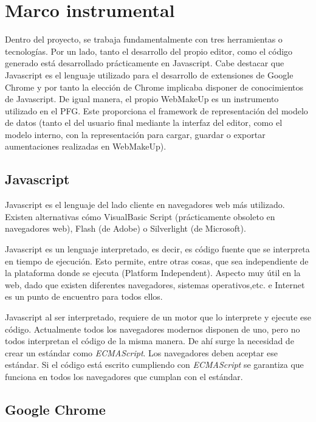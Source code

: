 \section{Marco instrumental}

Dentro del proyecto, se trabaja fundamentalmente con tres herramientas o tecnologías. Por un lado, tanto el desarrollo del propio editor, como el código generado está desarrollado prácticamente en Javascript. Cabe destacar que Javascript es el lenguaje utilizado para el desarrollo de extensiones de Google Chrome y por tanto la elección de Chrome implicaba disponer de conocimientos de Javascript. De igual manera, el propio WebMakeUp es un instrumento utilizado en el PFG. Este proporciona el framework de representación del modelo de datos (tanto el del usuario final mediante la interfaz del editor, como el modelo interno, con la representación para cargar, guardar o exportar aumentaciones realizadas en WebMakeUp).

\subsection{Javascript}

Javascript es el lenguaje del lado cliente en navegadores web más utilizado. Existen alternativas cómo VisualBasic Script (prácticamente obsoleto en navegadores web), Flash (de Adobe) o Silverlight (de Microsoft).

Javascript es un lenguaje interpretado, es decir, es código fuente que se interpreta en tiempo de ejecución. Esto permite, entre otras cosas, que sea independiente de la plataforma donde se ejecuta (Platform Independent). Aspecto muy útil en la web, dado que existen diferentes navegadores, sistemas operativos,etc. e Internet es un punto de encuentro para todos ellos.

Javascript al ser interpretado, requiere de un motor que lo interprete y ejecute ese código. Actualmente todos los navegadores modernos disponen de uno, pero no todos interpretan el código de la misma manera. De ahí surge la necesidad de crear un estándar como \emph{ECMAScript}. Los navegadores deben aceptar ese estándar. Si el código está escrito cumpliendo con \emph{ECMAScript} se garantiza que funciona en todos los navegadores que cumplan con el estándar.

\subsection{Google Chrome}

